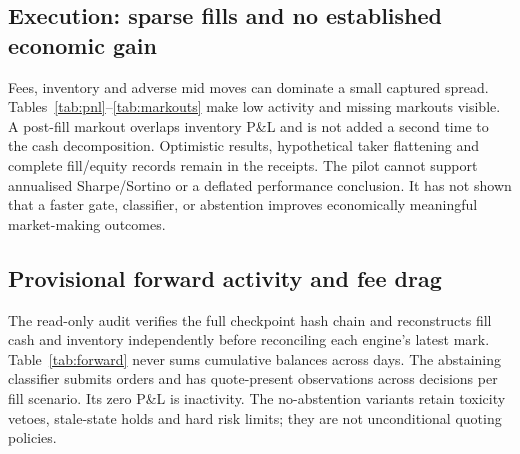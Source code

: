 \documentclass[11pt]{article}
\begin{document}
\subsection{Execution: sparse fills and no established economic gain}
\begin{table}[htbp]\centering\small

\caption{All pessimistic development scenarios, in USD. R/C denote rules/classifier;
+A adds validation-selected abstention. Inventory is the marked inventory component;
spread plus inventory minus fees reconciles P\&L. Zero fills are retained.}
\label{tab:pnl}\end{table}
\begin{table}[htbp]\centering\small

\caption{Pessimistic non-abstaining development diagnostics. Markout cells show
mean signed mid move in bp and usable endpoint count; missing endpoints are
censored. Fill rate is filled volume/submitted volume. No block CI is supported.}
\label{tab:markouts}\end{table}
Fees, inventory and adverse mid moves can dominate a small captured spread.
Tables~\ref{tab:pnl}--\ref{tab:markouts} make low activity and missing markouts
visible. A post-fill markout overlaps inventory P\&L and is not added a second
time to the cash decomposition. Optimistic results, hypothetical taker flattening
and complete fill/equity records remain in the receipts. The pilot cannot support
annualised Sharpe/Sortino or a deflated performance conclusion. It has not shown
that a faster gate, classifier, or abstention improves economically meaningful
market-making outcomes.

\subsection{Provisional forward activity and fee drag}
\begin{table}[htbp]\centering\small

\caption{Descriptive cumulative paper monitoring through \AuditTime{}, aggregated
across markets from commissioning, including time before the test window.
R/C denote rules/classifier, +A denotes abstention. The audited prefix contains
\AuditedRows{} records. Both fill scenarios are retained; these are not final test
results or confidence estimates.}
\label{tab:forward}\end{table}
The read-only audit verifies the full checkpoint hash chain and reconstructs fill
cash and inventory independently before reconciling each engine's latest mark.
Table~\ref{tab:forward} never sums cumulative balances across days.
The abstaining classifier submits \ForwardAbstainOrders{} orders and has
\ForwardAbstainQuotes{} quote-present observations across \ForwardDecisions{}
decisions per fill scenario. Its zero P\&L is inactivity. The no-abstention variants
retain toxicity vetoes, stale-state holds and hard risk limits; they are not
unconditional quoting policies.
\end{document}
